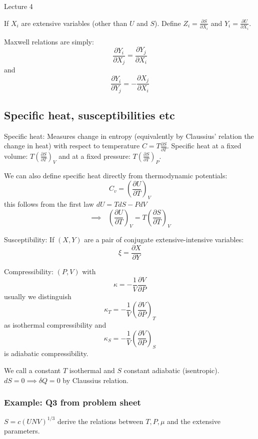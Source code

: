 \begin{center}

Lecture 4

\end{center}

If $X_i$ are extensive variables (other than $U$ and $S$). Define $Z_i = \frac{\partial S}{\partial X_i}$ and $Y_i = \frac{\partial U}{\partial X_i}$.

Maxwell relations are simply: $$\frac{\partial Y_i}{\partial X_j} = \frac{\partial Y_j}{\partial X_i}$$ and $$\frac{\partial Y_i}{\partial Y_j} = - \frac{\partial X_j}{\partial X_i}$$

\subsection{Specific heat, susceptibilities etc}

Specific heat: Measures change in entropy (equivalently by Claussius' relation the change in heat) with respect to temperature $C = T \frac{\partial S}{\partial T}$. Specific heat at a fixed volume: $T \left(\frac{\partial S}{\partial T}\right)_V$ and at a fixed pressure: $T \left(\frac{\partial S}{\partial T}\right)_P$.

We can also define specific heat directly from thermodynamic potentials: $$C_v = \left(\frac{\partial U}{\partial T}\right)_V$$ this follows from the first law $dU = TdS - PdV$ $$\implies \, \, \, \, \left(\frac{\partial U}{\partial T}\right)_V = T \left(\frac{\partial S}{\partial T}\right)_V$$

Susceptibility: If $(X,Y)$ are a pair of conjugate extensive-intensive variables: $$\xi = \frac{\partial X}{\partial Y}$$

Compressibility: $(P,V)$ with $$\kappa = - \frac{1}{V} \frac{\partial V}{\partial P}$$ usually we distinguish $$\kappa_T = - \frac{1}{V} \left(\frac{\partial V}{\partial P}\right)_T$$ as isothermal compressibility and $$\kappa_S = - \frac{1}{V} \left(\frac{\partial V}{\partial P}\right)_S$$ is adiabatic compressibility.

We call a constant $T$ isothermal and $S$ constant adiabatic (isentropic). $dS = 0 \implies \delta Q = 0$ by Claussius relation. 

\subsubsection*{Example: Q3 from problem sheet}

$S=c(UNV)^{1/3}$ derive the relations between $T, P, \mu$ and the extensive parameters.

